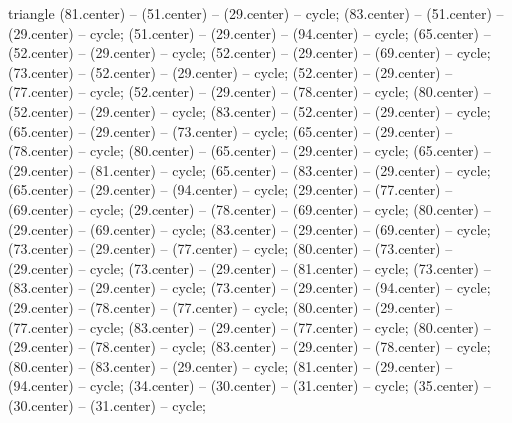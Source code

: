 \begin{pgfonlayer}{triangle}
 (81.center) -- (51.center) -- (29.center) -- cycle; 
 (83.center) -- (51.center) -- (29.center) -- cycle; 
 (51.center) -- (29.center) -- (94.center) -- cycle; 
 (65.center) -- (52.center) -- (29.center) -- cycle; 
 (52.center) -- (29.center) -- (69.center) -- cycle; 
 (73.center) -- (52.center) -- (29.center) -- cycle; 
 (52.center) -- (29.center) -- (77.center) -- cycle; 
 (52.center) -- (29.center) -- (78.center) -- cycle; 
 (80.center) -- (52.center) -- (29.center) -- cycle; 
 (83.center) -- (52.center) -- (29.center) -- cycle; 
 (65.center) -- (29.center) -- (73.center) -- cycle; 
 (65.center) -- (29.center) -- (78.center) -- cycle; 
 (80.center) -- (65.center) -- (29.center) -- cycle; 
 (65.center) -- (29.center) -- (81.center) -- cycle; 
 (65.center) -- (83.center) -- (29.center) -- cycle; 
 (65.center) -- (29.center) -- (94.center) -- cycle; 
 (29.center) -- (77.center) -- (69.center) -- cycle; 
 (29.center) -- (78.center) -- (69.center) -- cycle; 
 (80.center) -- (29.center) -- (69.center) -- cycle; 
 (83.center) -- (29.center) -- (69.center) -- cycle; 
 (73.center) -- (29.center) -- (77.center) -- cycle; 
 (80.center) -- (73.center) -- (29.center) -- cycle; 
 (73.center) -- (29.center) -- (81.center) -- cycle; 
 (73.center) -- (83.center) -- (29.center) -- cycle; 
 (73.center) -- (29.center) -- (94.center) -- cycle; 
 (29.center) -- (78.center) -- (77.center) -- cycle; 
 (80.center) -- (29.center) -- (77.center) -- cycle; 
 (83.center) -- (29.center) -- (77.center) -- cycle; 
 (80.center) -- (29.center) -- (78.center) -- cycle; 
 (83.center) -- (29.center) -- (78.center) -- cycle; 
 (80.center) -- (83.center) -- (29.center) -- cycle; 
 (81.center) -- (29.center) -- (94.center) -- cycle; 
 (34.center) -- (30.center) -- (31.center) -- cycle; 
 (35.center) -- (30.center) -- (31.center) -- cycle; 

\end{pgfonlayer}
